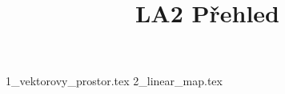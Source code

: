 \documentclass[a4paper]{article}
\begin{document}
\title{LA2 Přehled}

\maketitle
\pagebreak

{1_vektorovy_prostor.tex}
{2_linear_map.tex}
\end{document}

